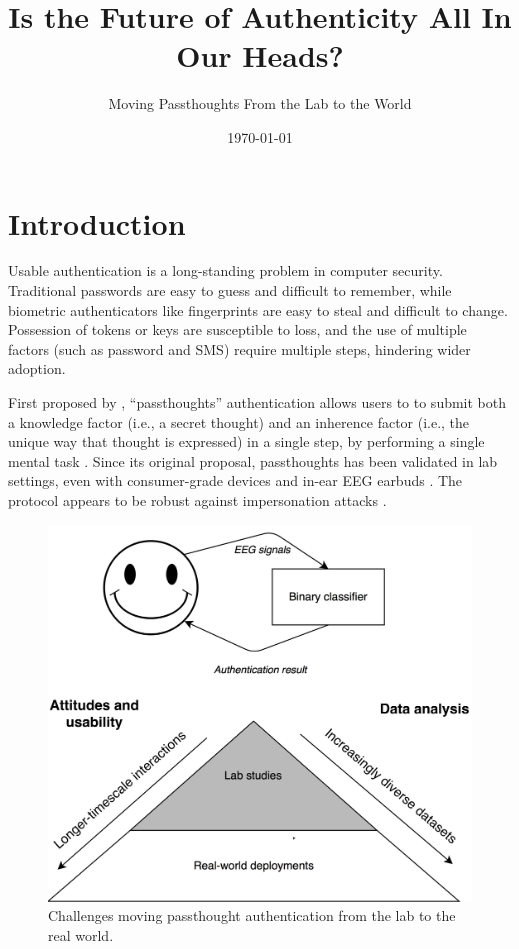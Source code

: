 \documentclass[sigconf]{acmart}
\date{\today}
\title{Is the Future of Authenticity All In Our Heads?}
\begin{document}
\maketitle
\subtitle{Moving Passthoughts From the Lab to the World}

\section{Introduction}
\label{sec:orgea4abb3}

Usable authentication is a long-standing problem in computer security.
Traditional passwords are easy to guess and difficult to remember,
while biometric authenticators like fingerprints are easy to steal and difficult to change.
Possession of tokens or keys are susceptible to loss, 
and the use of multiple factors (such as password and SMS) require multiple steps, hindering wider adoption.

First proposed by \cite{Thorpe2005}, ``passthoughts'' authentication allows users to 
to submit both a knowledge factor (i.e., a secret thought) and an inherence factor (i.e., the unique way that thought is expressed)
in a single step, by performing a single mental task \cite{Johnson2014}.
Since its original proposal, passthoughts has been validated in lab settings, even with 
consumer-grade devices \cite{Chuang2013b} and in-ear EEG earbuds \cite{curranpassthoughts}.
The protocol appears to be robust against impersonation attacks \cite{Johnson2014}.


\label{fig:diagram}
\begin{figure}[htbp]
\centering
\includegraphics[width=.9\linewidth]{./figures/passthoughts-diagram.png}
\caption{Challenges moving passthought authentication from the lab to the real world.}
\end{figure}
\end{document}

